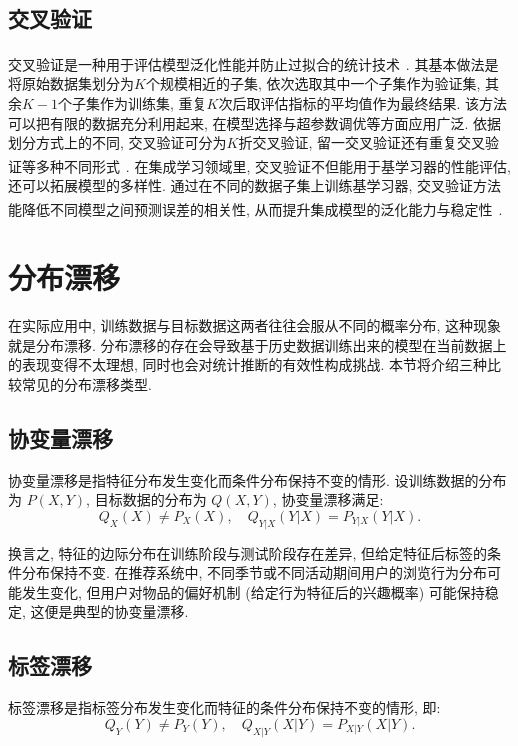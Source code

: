 \documentclass[a4paper, AutoFakeBold, UTF8]{ctexrep}
\theoremstyle{plain}
\newcommand{\upcite}[1]
{\textsuperscript{~\cite{#1}}}
\numberwithin{equation}{chapter}
\begin{document}
\subsection{交叉验证}

交叉验证是一种用于评估模型泛化性能并防止过拟合的统计技术\upcite{Stone1974}. 其基本做法是将原始数据集划分为$K$个规模相近的子集, 依次选取其中一个子集作为验证集, 其余$K-1$个子集作为训练集, 重复$K$次后取评估指标的平均值作为最终结果. 该方法可以把有限的数据充分利用起来, 在模型选择与超参数调优等方面应用广泛. 依据划分方式上的不同, 交叉验证可分为$K$折交叉验证, 留一交叉验证还有重复交叉验证等多种不同形式\upcite{Arlot2010}. 在集成学习领域里, 交叉验证不但能用于基学习器的性能评估, 还可以拓展模型的多样性. 通过在不同的数据子集上训练基学习器, 交叉验证方法能降低不同模型之间预测误差的相关性, 从而提升集成模型的泛化能力与稳定性\upcite{Kohavi1995}. 

\section{分布漂移}

在实际应用中, 训练数据与目标数据这两者往往会服从不同的概率分布, 这种现象就是分布漂移. 分布漂移的存在会导致基于历史数据训练出来的模型在当前数据上的表现变得不太理想, 同时也会对统计推断的有效性构成挑战. 本节将介绍三种比较常见的分布漂移类型. 

\subsection{协变量漂移}

协变量漂移是指特征分布发生变化而条件分布保持不变的情形. 设训练数据的分布为 $P (X, Y) $, 目标数据的分布为 $Q (X, Y) $, 协变量漂移满足: 
\begin{equation}
Q_X (X)  \neq P_X (X), \quad Q_{Y|X} (Y|X)  = P_{Y|X} (Y|X). \label{eq: covariate_shift}
\end{equation}

换言之, 特征的边际分布在训练阶段与测试阶段存在差异, 但给定特征后标签的条件分布保持不变. 在推荐系统中, 不同季节或不同活动期间用户的浏览行为分布可能发生变化, 但用户对物品的偏好机制 (给定行为特征后的兴趣概率) 可能保持稳定, 这便是典型的协变量漂移. 

\subsection{标签漂移}

标签漂移是指标签分布发生变化而特征的条件分布保持不变的情形, 即: 
\begin{equation}
Q_Y (Y)  \neq P_Y (Y), \quad Q_{X|Y} (X|Y)  = P_{X|Y} (X|Y). \label{eq: label_shift}
\end{equation}
\end{document}
